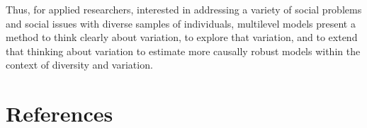 \documentclass[
  letterpaper,
  DIV=11,
  numbers=noendperiod]{scrreprt}
\begin{document}
Thus, for applied researchers, interested in addressing a variety of
social problems and social issues with diverse samples of individuals,
multilevel models present a method to think clearly about variation, to
explore that variation, and to extend that thinking about variation to
estimate more causally robust models within the context of diversity and
variation.


\hypertarget{references}{%
\chapter*{References}\label{references}}


\hypertarget{refs}{}
\end{document}
